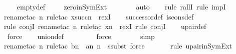 \begin{isabellebody}
\ \ \isamarkupfalse%
\ empty{\isacharunderscore}{\kern0pt}def\ \isanewline
\ \ \isamarkupfalse%
\ zero{\isacharunderscore}{\kern0pt}in{\isacharunderscore}{\kern0pt}SymExt\ \isanewline
\ \ \ \ \ \isamarkupfalse%
\ auto{\isacharbrackleft}{\kern0pt}{}{\isacharbrackright}{\kern0pt}\isanewline
\ \ \ \isamarkupfalse%
{\isacharparenleft}{\kern0pt}rule\ rallI{\isacharcomma}{\kern0pt}\ rule\ impI{\isacharparenright}{\kern0pt}\isanewline
\ \ \ \isamarkupfalse%
{\isacharparenleft}{\kern0pt}rename{\isacharunderscore}{\kern0pt}tac\ n{\isacharcomma}{\kern0pt}\ rule{\isacharunderscore}{\kern0pt}tac\ x{\isacharequal}{\kern0pt}{\isachardoublequoteopen}succ{\isacharparenleft}{\kern0pt}n{\isacharparenright}{\kern0pt}{\isachardoublequoteclose}\ \ rexI{\isacharparenright}{\kern0pt}\isanewline
\ \ \isamarkupfalse%
\ successor{\isacharunderscore}{\kern0pt}def\ is{\isacharunderscore}{\kern0pt}cons{\isacharunderscore}{\kern0pt}def\ \isanewline
\ \ \ \ \isamarkupfalse%
{\isacharparenleft}{\kern0pt}rule\ conjI{\isacharcomma}{\kern0pt}\ rename{\isacharunderscore}{\kern0pt}tac\ n{\isacharcomma}{\kern0pt}\ rule{\isacharunderscore}{\kern0pt}tac\ x{\isacharequal}{\kern0pt}{\isachardoublequoteopen}{\isacharbraceleft}{\kern0pt}n{\isacharbraceright}{\kern0pt}{\isachardoublequoteclose}\ \ rexI{\isacharcomma}{\kern0pt}\ rule\ conjI{\isacharparenright}{\kern0pt}\isanewline
\ \ \isamarkupfalse%
\ upair{\isacharunderscore}{\kern0pt}def\ \isanewline
\ \ \ \ \ \ \ \isamarkupfalse%
\ force\isanewline
\ \ \isamarkupfalse%
\ union{\isacharunderscore}{\kern0pt}def\ \isanewline
\ \ \ \ \ \ \isamarkupfalse%
\ force\ \isanewline
\ \ \ \ \ \isamarkupfalse%
\ simp\isanewline
\ \ \ \ \ \isamarkupfalse%
{\isacharparenleft}{\kern0pt}rename{\isacharunderscore}{\kern0pt}tac\ n{\isacharcomma}{\kern0pt}\ rule{\isacharunderscore}{\kern0pt}tac\ b{\isacharequal}{\kern0pt}{\isachardoublequoteopen}{\isacharbraceleft}{\kern0pt}n{\isacharbraceright}{\kern0pt}{\isachardoublequoteclose}\ \ a{\isacharequal}{\kern0pt}{\isachardoublequoteopen}{\isacharbraceleft}{\kern0pt}n{\isacharcomma}{\kern0pt}\ n{\isacharbraceright}{\kern0pt}{\isachardoublequoteclose}\ \ ssubst{\isacharcomma}{\kern0pt}\ force{\isacharparenright}{\kern0pt}\isanewline
\ \ \ \ \ \isamarkupfalse%
\ {\isacharparenleft}{\kern0pt}rule\ upair{\isacharunderscore}{\kern0pt}in{\isacharunderscore}{\kern0pt}SymExt{\isacharparenright}{\kern0pt}\isanewline

\end{isabellebody}
